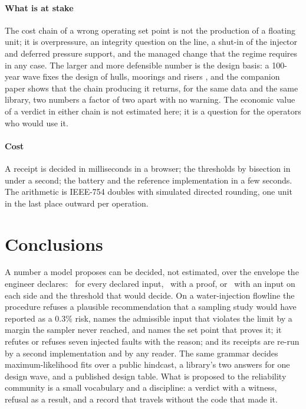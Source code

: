 \documentclass[preprint,11pt,authoryear]{elsarticle}
\begin{document}
\paragraph{What is at stake}
The cost chain of a wrong operating set point is not the production of a floating unit; it is overpressure, an integrity question on the line, a shut-in of the injector and deferred pressure support, and the managed change that the regime requires in any case. The larger and more defensible number is the design basis: a 100-year wave fixes the design of hulls, moorings and risers \citep{iso19901,dnv2021}, and the companion paper shows that the chain producing it returns, for the same data and the same library, two numbers a factor of two apart with no warning. The economic value of a verdict in either chain is not estimated here; it is a question for the operators who would use it.

\paragraph{Cost}
A receipt is decided in milliseconds in a browser; the thresholds by bisection in under a second; the battery and the reference implementation in a few seconds. The arithmetic is IEEE-754 doubles with simulated directed rounding, one unit in the last place outward per operation.

\section{Conclusions}\label{sec:conclusions}
A number a model proposes can be decided, not estimated, over the envelope the engineer declares: \vProved\ for every declared input, \vRefuted\ with a proof, or \vRefused\ with an input on each side and the threshold that would decide. On a water-injection flowline the procedure refuses a plausible recommendation that a sampling study would have reported as a 0.3\% risk, names the admissible input that violates the limit by a margin the sampler never reached, and names the set point that proves it; it refutes or refuses seven injected faults with the reason; and its receipts are re-run by a second implementation and by any reader. The same grammar decides maximum-likelihood fits over a public hindcast, a library's two answers for one design wave, and a published design table. What is proposed to the reliability community is a small vocabulary and a discipline: a verdict with a witness, refusal as a result, and a record that travels without the code that made it.
\end{document}
